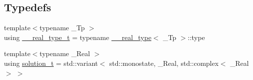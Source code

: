 \subsection*{Typedefs}
\begin{DoxyCompactItemize}
\item 
{\footnotesize template$<$typename \+\_\+\+Tp $>$ }\\using \hyperlink{namespace____gnu__cxx_a3f707c0c6f6926cf68b74072733751f7}{\+\_\+\+\_\+real\+\_\+type\+\_\+t} = typename \hyperlink{struct____gnu__cxx_1_1____real__type}{\+\_\+\+\_\+real\+\_\+type}$<$ \+\_\+\+Tp $>$\+::type
\item 
{\footnotesize template$<$typename \+\_\+\+Real $>$ }\\using \hyperlink{namespace____gnu__cxx_ae20ea642de50eb361074c62676b0159c}{solution\+\_\+t} = std\+::variant$<$ std\+::monostate, \+\_\+\+Real, std\+::complex$<$ \+\_\+\+Real $>$ $>$
\end{DoxyCompactItemize}
